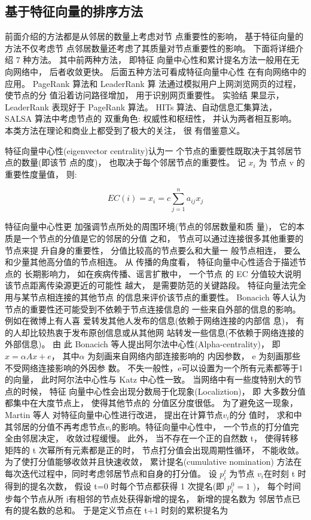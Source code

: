 	\subsection{基于特征向量的排序方法}
	前面介绍的方法都是从邻居的数量上考虑对节 点重要性的影响， 基于特征向量的方法不仅考虑节 点邻居数量还考虑了其质量对节点重要性的影响。 下面将详细介绍 7 种方法。 其中前两种方法， 即特征 向量中心性和累计提名方法一般用在无向网络中， 后者收敛更快。 后面五种方法可看成特征向量中心性 在有向网络中的应用。 PageRank 算法和 LeaderRank 算 法通过模拟用户上网浏览网页的过程， 使节点的分 值沿着访问路径增加， 用于识别网页重要性。 实验结 果显示， LeaderRank 表现好于 PageRank 算法。 HITs 算法、自动信息汇集算法， SALSA 算法中考虑节点的 双重角色: 权威性和枢纽性， 并认为两者相互影响。 本类方法在理论和商业上都受到了极大的关注， 很 有借鉴意义。

	特征向量中心性(eigenvector centrality)\parencite{Phillip1972Factoring}认为一 个节点的重要性既取决于其邻居节点的数量(即该节 点的度)， 也取决于每个邻居节点的重要性。 记 $x_i$ 为 节点 v 的重要性度量值， 则:

				$$EC(i)=x_i=c\sum\limits_{j=1}^n {a_{ij}x_j}$$

				特征向量中心性更 加强调节点所处的周围环境(节点的邻居数量和质 量)， 它的本质是一个节点的分值是它的邻居的分值 之和， 节点可以通过连接很多其他重要的节点来提 升自身的重要性， 分值比较高的节点要么和大量一 般节点相连， 要么和少量其他高分值的节点相连。 从 传播的角度看， 特征向量中心性适合于描述节点的 长期影响力， 如在疾病传播、谣言扩散中， 一个节点 的 EC 分值较大说明该节点距离传染源更近的可能性 越大， 是需要防范的关键路段。
				特征向量法完全用与某节点相连接的其他节点 的信息来评价该节点的重要性。 Bonacich 等人\parencite{Bonacich2001Eigenvector}认为 节点的重要性还可能受到不依赖于节点连接信息的 一些来自外部的信息的影响。 例如在微博上有人喜 爱转发其他人发布的信息(依赖于网络连接的内部信 息)， 有的人却比较热衷于发布原创信息或从其他网 站转发一些信息(不依赖于网络连接的外部信息)。 由 此 Bonacich 等人提出阿尔法中心性(Alpha-centrality)， 即 $x=\alpha Ax+e$， 其中$\alpha$ 为刻画来自网络内部连接影响的 内因参数， e 为刻画那些不受网络连接影响的外因参 数。 不失一般性，e可以设置为一个所有元素都等于1 的向量， 此时阿尔法中心性与 Katz 中心性一致。
				当网络中有一些度特别大的节点的时候， 特征 向量中心性会出现分数局于化现象(Localiztion)， 即 大多数分值都集中在大度节点上， 使得其他节点的 分值区分度很低。 为了避免这一现象， Martin 等人\parencite{Martin2015Localization} 对特征向量中心性进行改进， 提出在计算节点$v_i$的分 值时， 求和中其邻居的分值不再考虑节点$v_i$的影响。特征向量中心性中， 一个节点的打分值完全由邻居决定， 收敛过程缓慢。 此外， 当不存在一个正的自然数 t， 使得转移矩阵的 t 次幂所有元素都是正的时， 节点打分值会出现周期性循环， 不能收敛。 为了使打分值能够收敛并且快速收敛， 累计提名(cumulative nomination) \parencite{Wei2013Identifying}方法在每次迭代过程中，同时考虑邻居节点和自身的打分值。 设 $p_i^t$ 为节点 $v_i$在时刻 t 时得到的提名次数， 假设 t=0 时每个节点都获得 1 次提名(即 $p_i^0 =1$ )， 每个时间步每个节点从所 i有相邻的节点处获得新增的提名， 新增的提名数为 邻居节点已有的提名数的总和。 于是定义节点在 t+1 时刻的累积提名为

